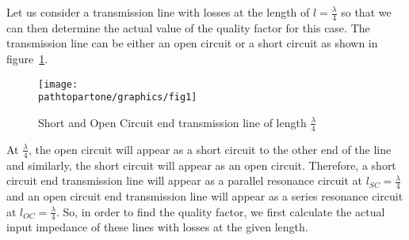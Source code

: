 


Let us consider a transmission line with losses at the length of $ l=\frac{\lambda}{4}$ so that we can then determine the actual value of the quality factor for this case. The transmission line can be either an open circuit or a short circuit as shown in figure~\ref{fig:fig1}.
\begin{figure}[h]
\centering
\texttt{[image: \\pathtopartone/graphics/fig1]}
\caption{Short and Open Circuit end transmission line of length $\frac{\lambda}{4}$}
\label{fig:fig1}
\end{figure}

At $ \frac{\lambda}{4} $, the open circuit will appear as a short circuit to the other end of the line and similarly, the short circuit will appear as an open circuit. Therefore, a short circuit end transmission line will appear as a parallel resonance circuit at $ l_{SC}=\frac{\lambda}{4} $ and an open circuit end transmission line will appear as a series resonance circuit at $ l_{OC}=\frac{\lambda}{4} $. So, in order to find the quality factor, we first calculate the actual input impedance of these lines with losses at the given length.

